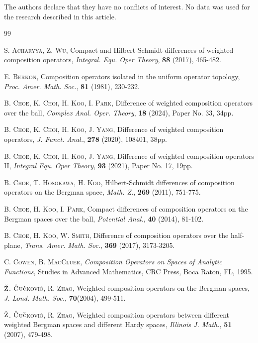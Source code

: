 \documentclass[preprint,12pt,times]{elsarticle}
\theoremstyle{definition}
\theoremstyle{remark}
\numberwithin{equation}{section}
\begin{document}
The authors declare that they have no conflicts of interest. No data was used for the research described in this article. 


\begin{thebibliography}{99}
	
	 \textsc{S. Acharyya, Z. Wu}, Compact and Hilbert-Schmidt differences of weighted composition operators, \textit{Integral. Equ. Oper Theory}, \textbf{88} (2017), 465-482.

 \textsc{E. Berkon}, Composition operators isolated in the uniform operator topology, \textit{Proc. Amer. Math. Soc.}, \textbf{81} (1981), 230-232.

 \textsc{B. Choe, K. Choi, H. Koo, I. Park}, Difference of weighted composition operators over the ball, \textit{Complex Anal. Oper. Theory}, \textbf{18} (2024), Paper No. 33, 34pp.

 \textsc{B. Choe, K. Choi, H. Koo, J. Yang}, Difference of weighted composition operators, \textit{J. Funct. Anal.}, \textbf{278} (2020), 108401, 38pp.

 \textsc{B. Choe, K. Choi, H. Koo, J. Yang}, Difference of weighted composition operators II, \textit{Integral Equ. Oper Theory}, \textbf{93} (2021), Paper No. 17, 19pp.

 \textsc{B. Choe, T. Hosokawa, H. Koo}, Hilbert-Schmidt differences of composition operators on the Bergman space, \textit{Math. Z.}, \textbf{269} (2011), 751-775.

 \textsc{B. Choe, H. Koo, I. Park}, Compact differences of composition operators on the Bergman spaces over the ball, \textit{Potential Anal.}, \textbf{40} (2014), 81-102.

 \textsc{B. Choe, H. Koo, W. Smith}, Difference of composition operators over the half-plane, \textit{Trans. Amer. Math. Soc.}, \textbf{369} (2017), 3173-3205.

 \textsc{C. Cowen, B. MacCluer}, \textit{Composition Operators on Spaces of Analytic Functions}, Studies in Advanced Mathematics, CRC Press, Boca Raton, FL, 1995.

 \textsc{$\rm\check{Z}$. $\rm\check{C}$u$\rm\check{c}$kovi\'o, R. Zhao}, Weighted composition operators on the Bergman spaces, \textit{J. Lond. Math. Soc.}, \textbf{70}(2004), 499-511.

 \textsc{$\rm\check{Z}$. $\rm\check{C}$u$\rm\check{c}$kovi\'o, R. Zhao}, Weighted composition operators between different weighted Bergman spaces and different Hardy spaces, \textit{Illinois J. Math.}, \textbf{51} (2007), 479-498.


\end{thebibliography}
\end{document}

